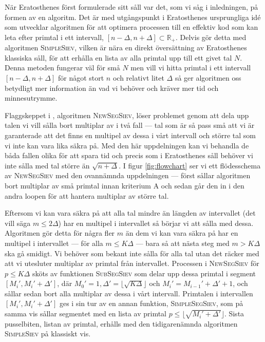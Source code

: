 


När Eratosthenes först formulerade sitt såll var det, som vi såg i inledningen, på formen av en algoritm. Det är med utgångspunkt i Eratosthenes ursprungliga idé som \cite{HaraldSieve} utvecklar algoritmen för att optimera processen till en effektiv kod som kan leta efter primtal i ett intervall, $[n - \Delta, n + \Delta] \subset \mathbb{R}_+$. Delvis gör \cite{HaraldSieve} detta med algoritmen \textsc{SimpleSiev}, vilken är nära en direkt översättning av Eratosthenes klassiska såll, för att erhålla en lista av alla primtal upp till ett givet tal $N$. Denna metoden fungerar väl för små $N$ men vill vi hitta primtal i ett intervall $[n - \Delta, n + \Delta]$ för något stort $n$ och relativt litet $\Delta$ så ger algoritmen oss betydligt mer information än vad vi behöver och kräver mer tid och minnesutrymme. 



Flaggskeppet i \cite{HaraldSieve}, algoritmen \textsc{NewSegSiev}, löser problemet genom att dela upp talen vi vill sålla bort multiplar av i två fall --- tal som är så pass små att vi är garanterade att det finns en multipel av dessa i vårt intervall och större tal som vi inte kan vara lika säkra på. Med den här uppdelningen kan vi behandla de båda fallen olika för att spara tid och precis som i Eratosthenes såll behöver vi inte sålla med tal större än \(\sqrt{n + \Delta}\). I figur \ref{fig:flowchart} ser vi ett flödesschema av \textsc{NewSegSiev} med den ovannämnda uppdelningen --- först sållar algoritmen bort multiplar av små primtal innan kriterium A och sedan går den in i den andra loopen för att hantera multiplar av större tal. 

Eftersom vi kan vara säkra på att alla tal mindre än längden av intervallet (det vill säga \(m \leq 2 \Delta\)) har en multipel i intervallet så börjar vi att sålla med dessa. Algoritmen gör detta för några fler \(m\) än dem vi kan vara säkra på har en multipel i intervallet --- för alla \(m \leq K \Delta\) --- bara så att nästa steg med \(m > K \Delta\) ska gå smidigt. Vi behöver som bekant inte sålla för alla tal utan det räcker med att vi utesluter multiplar av primtal från intervallet. Processen i \textsc{NewSegSiev} för \(p \leq K \Delta\) sköts av funktionen \textsc{SubSegSiev} som delar upp dessa primtal i segment \([M_i', M_i' + \Delta']\), där \(M_0' = 1, \Delta' = \lfloor \sqrt{K \Delta} \rfloor\) och \(M_i' = M_{i-1}' + \Delta' + 1\), och sållar sedan bort alla multiplar av dessa i vårt intervall. Primtalen i intervallen \([M_i', M_i' + \Delta']\) ges i sin tur av en annan funktion, \textsc{SimpleSegSiev}, som på samma vis sållar segmentet med en lista av primtal \(p \leq \lfloor\sqrt{M_i' + \Delta'}\rfloor\). Sista pusselbiten, listan av primtal, erhålls med den tidigarenämnda algoritmen \textsc{SimpleSiev} på klassiskt vis. 

